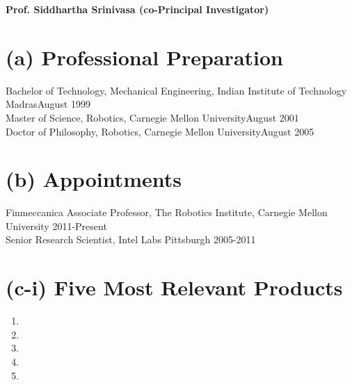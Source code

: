 \documentclass[10pt]{article}
\newcommand{\svn}[1]{\svnsub#1}
\def\svnsub$#1${#1}
\begin{document}
\pagestyle{empty} %

\par{\centering
		{\bf\LARGE Prof. Siddhartha Srinivasa (co-Principal Investigator)
	}\bigskip\par}





\section{(a) Professional Preparation}
\noindent
Bachelor of Technology, Mechanical Engineering, Indian Institute of Technology Madras\hfill August 1999\\
Master of Science, Robotics, Carnegie Mellon University\hfill August 2001\\
Doctor of Philosophy, Robotics, Carnegie Mellon University\hfill August 2005\\

\section{(b) Appointments}
\noindent
Finmeccanica Associate Professor, The Robotics Institute, Carnegie Mellon University \hfill 2011-Present\\
Senior Research Scientist, Intel Labs Pittsburgh \hfill 2005-2011\\

\section{(c-i) Five Most Relevant Products}
\renewcommand{\labelenumi}{[ \arabic{enumi} ]\hfill}
\begin{enumerate}

\item {}



\item {}

\item {}

\item {}

\item {}


\end{enumerate}
\end{document}

